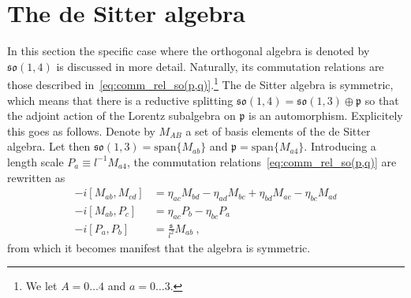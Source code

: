 \documentclass[10pt]{amsart}
\numberwithin{equation}{section}
\begin{document}
\section{The de Sitter algebra}

In this section the specific case where the orthogonal algebra is 
denoted by $\mathfrak{so}(1,4)$ is discussed in more detail.  
Naturally, its commutation relations are those described 
in~\eqref{eq:comm_rel_so(p,q)}.\footnote{We let $A = 0\ldots 4$ 
	and $a = 0\ldots 3$.} The de Sitter algebra is symmetric, 
which means that there is a reductive splitting 
$\mathfrak{so}(1,4) = \mathfrak{so}(1,3) \oplus \mathfrak{p}$ so 
that the adjoint action of the Lorentz subalgebra on 
$\mathfrak{p}$ is an automorphism. Explicitely this goes as 
follows. Denote by $M_{AB}$ a set of basis elements of the de 
Sitter algebra. Let then $\mathfrak{so}(1,3) = 
\mathrm{span}\{M_{ab}\}$ and $\mathfrak{p} = 
\mathrm{span}\{M_{a4}\}$. Introducing a length scale $P_a \equiv 
l^{-1} M_{a4}$, the commutation 
relations~\eqref{eq:comm_rel_so(p,q)} are rewritten as
%
\begin{equation}
\label{eq:comm_relations_so(1,4)}
\begin{split}
	-i[M_{ab},M_{cd}] &= \eta_{ac}M_{bd} - \eta_{ad}M_{bc} + 
	\eta_{bd}M_{ac} - \eta_{bc}M_{ad} \\
	-i[M_{ab},P_c] &= \eta_{ac}P_b- \eta_{bc}P_a\\
	-i[P_a,P_b] &= \frac{\mathfrak{s}}{l^2}M_{ab}~,
  \end{split}
\end{equation}
from which it becomes manifest that the algebra is symmetric.
\end{document}
